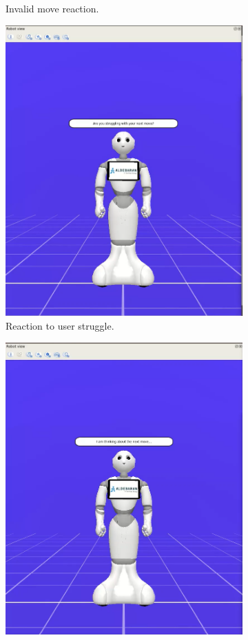 \documentclass{article}
\begin{document}
\begin{figure}[H]
\begin{subfigure}{.33\textwidth}
      \caption{Invalid move reaction. }
    \end{subfigure}%
    \begin{subfigure}{.33\textwidth}
      \centering
      \includegraphics[width=0.9\linewidth]{images/11_troppo tempo.png}
      \caption{Reaction to user struggle.}
    \end{subfigure}
    \newline
    \begin{subfigure}{.33\textwidth}
      \centering
      \includegraphics[width=0.9\linewidth]{images/12_tocca a pepper.png}

\end{subfigure}
\end{figure}
\end{document}
